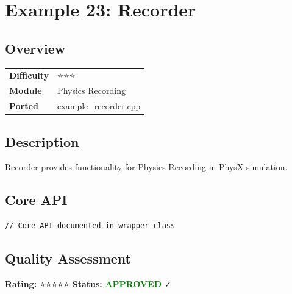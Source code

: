 \section{Example 23: Recorder}
\subsection{Overview}
\begin{table}[h]
\centering
\begin{tabular}{|l|l|}
\hline
\textbf{Difficulty} & ⭐⭐⭐ \\
\textbf{Module} & Physics Recording \\
\textbf{Ported} & example\_recorder.cpp \\
\hline
\end{tabular}
\end{table}

\subsection{Description}
Recorder provides functionality for Physics Recording in PhysX simulation.

\subsection{Core API}
\begin{lstlisting}
// Core API documented in wrapper class
\end{lstlisting}

\subsection{Quality Assessment}
\textbf{Rating:} ⭐⭐⭐⭐⭐ \quad \textbf{Status:} \textcolor{green}{\textbf{APPROVED}} ✓
